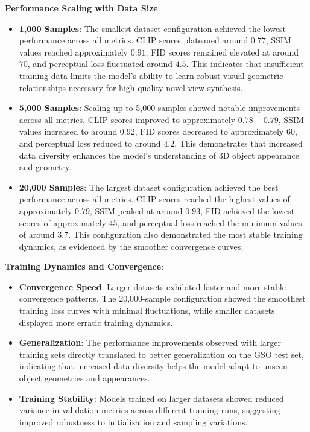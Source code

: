 \textbf{Performance Scaling with Data Size}:
\begin{itemize}
  \item \textbf{1,000 Samples}: The smallest dataset configuration achieved the lowest performance across all metrics. CLIP scores plateaued around $0.77$, SSIM values reached approximately $0.91$, FID scores remained elevated at around $70$, and perceptual loss fluctuated around $4.5$. This indicates that insufficient training data limits the model's ability to learn robust visual-geometric relationships necessary for high-quality novel view synthesis.

  \item \textbf{5,000 Samples}: Scaling up to 5,000 samples showed notable improvements across all metrics. CLIP scores improved to approximately $0.78-0.79$, SSIM values increased to around $0.92$, FID scores decreased to approximately $60$, and perceptual loss reduced to around $4.2$. This demonstrates that increased data diversity enhances the model's understanding of 3D object appearance and geometry.

  \item \textbf{20,000 Samples}: The largest dataset configuration achieved the best performance across all metrics. CLIP scores reached the highest values of approximately $0.79$, SSIM peaked at around $0.93$, FID achieved the lowest scores of approximately $45$, and perceptual loss reached the minimum values of around $3.7$. This configuration also demonstrated the most stable training dynamics, as evidenced by the smoother convergence curves.
\end{itemize}

\textbf{Training Dynamics and Convergence}:
\begin{itemize}
  \item \textbf{Convergence Speed}: Larger datasets exhibited faster and more stable convergence patterns. The 20,000-sample configuration showed the smoothest training loss curves with minimal fluctuations, while smaller datasets displayed more erratic training dynamics.
  \item \textbf{Generalization}: The performance improvements observed with larger training sets directly translated to better generalization on the GSO test set, indicating that increased data diversity helps the model adapt to unseen object geometries and appearances.
  \item \textbf{Training Stability}: Models trained on larger datasets showed reduced variance in validation metrics across different training runs, suggesting improved robustness to initialization and sampling variations.
\end{itemize}

